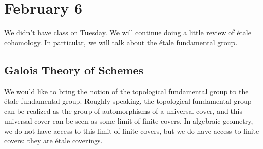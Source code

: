 \documentclass[../notes.tex]{subfiles}
\begin{document}
\section{February 6}

We didn't have class on Tuesday. We will continue doing a little review of \'etale cohomology. In particular, we will talk about the \'etale fundamental group.

\subsection{Galois Theory of Schemes}
We would like to bring the notion of the topological fundamental group to the \'etale fundamental group. Roughly speaking, the topological fundamental group can be realized as the group of automorphisms of a universal cover, and this universal cover can be seen as some limit of finite covers. In algebraic geometry, we do not have access to this limit of finite covers, but we do have access to finite covers: they are \'etale coverings.
\end{document}
